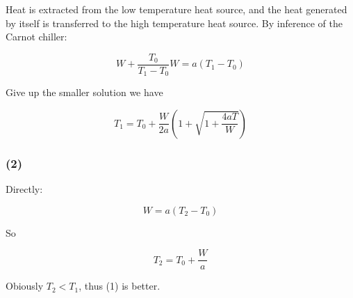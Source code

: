 \documentclass[a4paper,11pt]{amsart}
\theoremstyle{definition}
\begin{document}
	Heat is extracted from the low temperature heat source, and the heat generated by itself is transferred to the high temperature heat source. By inference of the Carnot chiller:
	
	$$
	W+\dfrac{T_0}{T_1-T_0}W=a(T_1-T_0)
	$$
	
	Give up the smaller solution we have
	
	$$
	T_1=T_0+\frac{W}{2a}\left( 1+\sqrt{1+\frac{4aT}{W}} \right) 
	$$
	
	\subsubsection*{(2)}
	
	Directly:
	
	$$
	W=a(T_2-T_0)
	$$
	
	So 
	
	$$
	T_2=T_0+\dfrac{W}{a}
	$$
	
	Obiously $T_2<T_1$, thus (1) is better.
	
\end{document}
